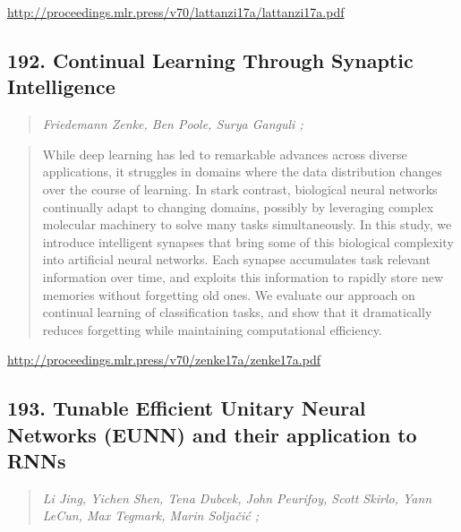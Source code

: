 \documentclass{article}
\begin{document}
\href{http://proceedings.mlr.press/v70/lattanzi17a/lattanzi17a.pdf}{http://proceedings.mlr.press/v70/lattanzi17a/lattanzi17a.pdf}

\subsection{192. Continual Learning Through Synaptic Intelligence}

\begin{quote}
\footnotesize{\textit{Friedemann Zenke, Ben Poole, Surya Ganguli ;}}
\end{quote}

\begin{quote}
    While deep learning has led to remarkable advances across diverse applications, it struggles in domains where the data distribution changes over the course of learning. In stark contrast, biological neural networks continually adapt to changing domains, possibly by leveraging complex molecular machinery to solve many tasks simultaneously. In this study, we introduce intelligent synapses that bring some of this biological complexity into artificial neural networks. Each synapse accumulates task relevant information over time, and exploits this information to rapidly store new memories without forgetting old ones. We evaluate our approach on continual learning of classification tasks, and show that it dramatically reduces forgetting while maintaining computational efficiency.  \end{quote}

\href{http://proceedings.mlr.press/v70/zenke17a/zenke17a.pdf}{http://proceedings.mlr.press/v70/zenke17a/zenke17a.pdf}

\subsection{193. Tunable Efficient Unitary Neural Networks (EUNN) and their application to RNNs}

\begin{quote}
\footnotesize{\textit{Li Jing, Yichen Shen, Tena Dubcek, John Peurifoy, Scott Skirlo, Yann LeCun, Max Tegmark, Marin Soljačić ;}}
\end{quote}
\end{document}
